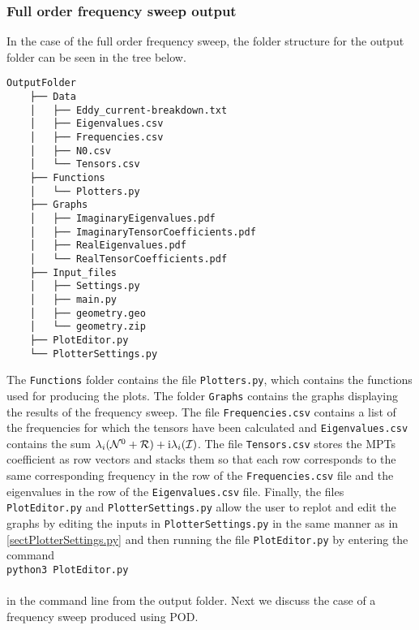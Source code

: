 \subsubsection{Full order frequency sweep output}
In the case of the full order frequency sweep, the folder structure for the output folder can be seen in the tree below.
\clearpage
\begin{Verbatim}
OutputFolder
    ├── Data
    │   ├── Eddy_current-breakdown.txt
    │   ├── Eigenvalues.csv
    │   ├── Frequencies.csv
    │   ├── N0.csv
    │   └── Tensors.csv
    ├── Functions
    │   └── Plotters.py
    ├── Graphs
    │   ├── ImaginaryEigenvalues.pdf
    │   ├── ImaginaryTensorCoefficients.pdf
    │   ├── RealEigenvalues.pdf
    │   └── RealTensorCoefficients.pdf
    ├── Input_files
    │   ├── Settings.py
    │   ├── main.py
    │   ├── geometry.geo
    │   └── geometry.zip
    ├── PlotEditor.py
    └── PlotterSettings.py
\end{Verbatim}

\noindent
The \texttt{Functions} folder contains the file \texttt{Plotters.py}, which contains the functions used for producing the plots. The folder \texttt{Graphs} contains the graphs displaying the results of the frequency sweep. The file \texttt{Frequencies.csv} contains a list of the frequencies for which the tensors have been calculated and  \texttt{Eigenvalues.csv} contains the sum  $\lambda_i(\mathcal{N}^0+\mathcal{R})+\mathrm{i}\lambda_i(\mathcal{I})$. The file \texttt{Tensors.csv} stores the MPTs coefficient as row vectors and stacks them so that each row corresponds to the same corresponding frequency in the row of the \texttt{Frequencies.csv} file and the eigenvalues in the row of the \texttt{Eigenvalues.csv} file. Finally, the files \texttt{PlotEditor.py} and \texttt{PlotterSettings.py}  allow the user to replot and edit the graphs by editing the inputs in \texttt{PlotterSettings.py} in the same manner as in \ref{sectPlotterSettings.py} and then running the file \texttt{PlotEditor.py}  by entering the command\\

\noindent \texttt{python3 PlotEditor.py}\\
\\
in the command line from the output folder. Next we discuss the case of a frequency sweep produced using POD.\\
